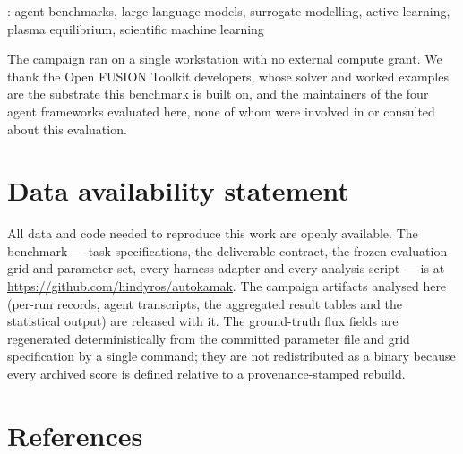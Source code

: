 \documentclass[12pt]{iopart}
\newcommand{\MLST}{{\it Mach. Learn.: Sci. Technol.}}
\begin{document}
: agent benchmarks, large language models, surrogate
modelling, active learning, plasma equilibrium, scientific machine learning

\submitto{\MLST}
\maketitle












\ack
The campaign ran on a single workstation with no external compute grant. We
thank the Open FUSION Toolkit developers, whose solver and worked examples are
the substrate this benchmark is built on, and the maintainers of the four agent
frameworks evaluated here, none of whom were involved in or consulted about this
evaluation.

\section*{Data availability statement}
All data and code needed to reproduce this work are openly available. The
benchmark --- task specifications, the deliverable contract, the frozen
evaluation grid and parameter set, every harness adapter and every analysis
script --- is at \url{https://github.com/hindyros/autokamak}. The campaign
artifacts analysed here (per-run records, agent transcripts, the aggregated
result tables and the statistical output) are released with it. The
ground-truth flux fields are regenerated deterministically from the committed
parameter file and grid specification by a single command; they are not
redistributed as a binary because every archived score is defined relative to a
provenance-stamped rebuild.

\appendix


\section*{References}


\end{document}
